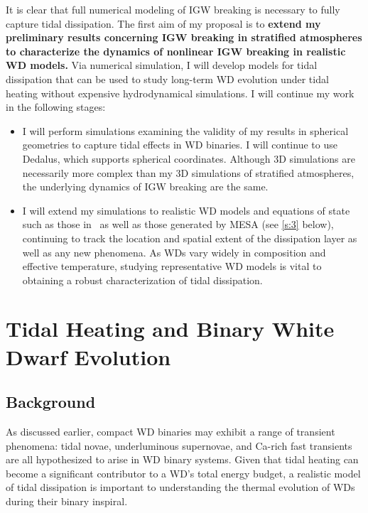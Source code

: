 \documentclass[12pt,
        usenames, %
        dvipsnames %
    ]{article}
\begin{document}
It is clear that full numerical modeling of IGW breaking is necessary to fully
capture tidal dissipation. The first aim of my proposal is to \textbf{extend my
preliminary results concerning IGW breaking in stratified atmospheres to
characterize the dynamics of nonlinear IGW breaking in realistic WD models.} Via
numerical simulation, I will develop models for tidal dissipation that can be
used to study long-term WD evolution under tidal heating without expensive
hydrodynamical simulations. I will continue my work in the following stages:
\begin{itemize}
    \item I will perform simulations examining the validity of my results in
        spherical geometries to capture tidal effects in WD binaries. I will
        continue to use Dedalus, which supports spherical coordinates. Although
        3D simulations are necessarily more complex than my 3D simulations of
        stratified atmospheres, the underlying dynamics of IGW breaking are the
        same.

    \item I will extend my simulations to realistic WD models and equations of
        state such as those in~\cite{brassard1992} as well as those generated by
        MESA\cite{MESA} (see \autoref{s:3} below), continuing to track the
        location and spatial extent of the dissipation layer as well as any new
        phenomena. As WDs vary widely in composition and effective temperature,
        studying representative WD models is vital to obtaining a robust
        characterization of tidal dissipation.
\end{itemize}

\section{Tidal Heating and Binary White Dwarf Evolution}\label{s:3}

\subsection{Background}

As discussed earlier, compact WD binaries may exhibit a range of transient
phenomena: tidal novae\cite{tidal_novae}, underluminous
supernovae\cite{underlum}, and Ca-rich fast transients\cite{carich} are all
hypothesized to arise in WD binary systems. Given that tidal heating can become
a significant contributor to a WD's total energy budget, a realistic model of
tidal dissipation is important to understanding the thermal evolution of WDs
during their binary inspiral.
\end{document}
